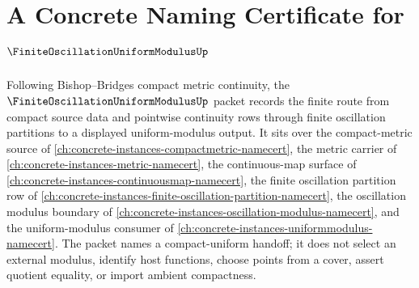 \chapter{A Concrete Naming Certificate for $\FiniteOscillationUniformModulusUp$}
\label{ch:concrete-instances-finite-oscillation-uniform-modulus-namecert}

Following Bishop--Bridges compact metric continuity, the $\FiniteOscillationUniformModulusUp$ packet records the finite route from compact source data and pointwise continuity rows through finite oscillation partitions to a displayed uniform-modulus output. It sits over the compact-metric source of \autoref{ch:concrete-instances-compactmetric-namecert}, the metric carrier of \autoref{ch:concrete-instances-metric-namecert}, the continuous-map surface of \autoref{ch:concrete-instances-continuousmap-namecert}, the finite oscillation partition row of \autoref{ch:concrete-instances-finite-oscillation-partition-namecert}, the oscillation modulus boundary of \autoref{ch:concrete-instances-oscillation-modulus-namecert}, and the uniform-modulus consumer of \autoref{ch:concrete-instances-uniformmodulus-namecert}. The packet names a compact-uniform handoff; it does not select an external modulus, identify host functions, choose points from a cover, assert quotient equality, or import ambient compactness.

